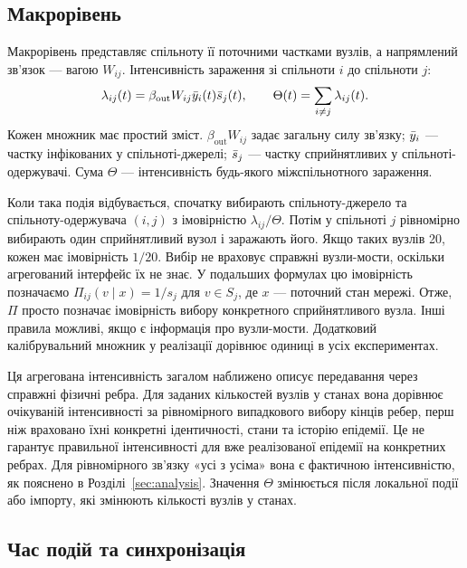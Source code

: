 \subsection{Макрорівень}
\label{sec:macro}

Макрорівень представляє спільноту її поточними частками вузлів, а напрямлений зв'язок --- вагою $W_{ij}$. Інтенсивність зараження зі спільноти $i$ до спільноти $j$:
\begin{equation}
\label{eq:macro_rate}
\lambda_{ij}(t)=\beta_{\mathrm{out}}W_{ij}\bar{y}_i(t)\bar{s}_j(t),
\qquad \Theta(t)=\sum_{i\neq j}\lambda_{ij}(t).
\end{equation}
Кожен множник має простий зміст. $\beta_{\mathrm{out}}W_{ij}$ задає загальну силу зв'язку; $\bar{y}_i$ --- частку інфікованих у спільноті-джерелі; $\bar{s}_j$ --- частку сприйнятливих у спільноті-одержувачі. Сума $\Theta$ --- інтенсивність будь-якого міжспільнотного зараження.

Коли така подія відбувається, спочатку вибирають спільноту-джерело та спільноту-одержувача $(i,j)$ з імовірністю $\lambda_{ij}/\Theta$. Потім у спільноті $j$ рівномірно вибирають один сприйнятливий вузол і заражають його. Якщо таких вузлів 20, кожен має імовірність $1/20$. Вибір не враховує справжні вузли-мости, оскільки агрегований інтерфейс їх не знає. У подальших формулах цю імовірність позначаємо $\Pi_{ij}(v\mid x)=1/s_j$ для $v\in S_j$, де $x$ --- поточний стан мережі. Отже, $\Pi$ просто позначає імовірність вибору конкретного сприйнятливого вузла. Інші правила можливі, якщо є інформація про вузли-мости. Додатковий калібрувальний множник у реалізації дорівнює одиниці в усіх експериментах.

Ця агрегована інтенсивність загалом наближено описує передавання через справжні фізичні ребра. Для заданих кількостей вузлів у станах вона дорівнює очікуваній інтенсивності за рівномірного випадкового вибору кінців ребер, перш ніж враховано їхні конкретні ідентичності, стани та історію епідемії. Це не гарантує правильної інтенсивності для вже реалізованої епідемії на конкретних ребрах. Для рівномірного зв'язку «усі з усіма» вона є фактичною інтенсивністю, як пояснено в Розділі~\ref{sec:analysis}. Значення $\Theta$ змінюється після локальної події або імпорту, які змінюють кількості вузлів у станах.

\subsection{Час подій та синхронізація}
\label{sec:timing}


